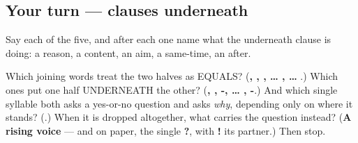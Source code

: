 \subsection*{Your turn — clauses underneath}
Say each of the five, and after each one name what the underneath clause is doing: a reason, a content, an aim, a same-time, an after.

\begin{tcolorbox}[breakable,colback=teal!4,colframe=teal!35!black,title={Before you move on}]
Which joining words treat the two halves as EQUALS? (\textbf{, , ,  … ,  … }.) Which ones put one half UNDERNEATH the other? (\textbf{, , -,  … , -}.) And which single syllable both asks a yes-or-no question and asks \emph{why}, depending only on where it stands? (\textbf{}.) When it is dropped altogether, what carries the question instead? (\textbf{A rising voice} — and on paper, the single \textbf{?}, with \textbf{!} its partner.) Then stop.
\end{tcolorbox}
